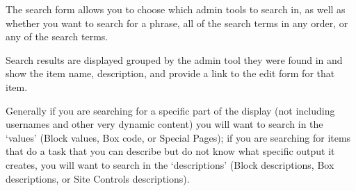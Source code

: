 The search form allows you to choose which admin tools to search in, as well as whether you want to search for a phrase, all of the search terms in any order, or any of the search terms.

Search results are displayed grouped by the admin tool they were found in and show the item name, description, and provide a link to the edit form for that item.

Generally if you are searching for a specific part of the display (not including usernames and other very dynamic content) you will want to search in the `values' (Block values, Box code, or Special Pages); if you are searching for items that do a task that you can describe but do not know what specific output it creates, you will want to search in the `descriptions' (Block descriptions, Box descriptions, or Site Controls descriptions).

